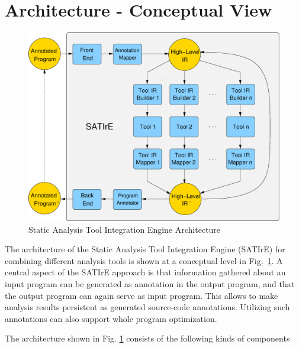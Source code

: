 \documentclass[a4paper,12pt]{report}
\newcommand{\satire}[0]{SATIrE}
\begin{document}
\section{Architecture - Conceptual View}
\label{sec:abstractarchitecture}

\begin{figure}
\includegraphics[scale=0.37]{abstractsatirearchitecture}
\caption{Static Analysis Tool Integration Engine Architecture}
\label{fig:abstractsatirearchitecture}
\end{figure}

The architecture of the Static Analysis Tool Integration Engine
(\satire) for combining different analysis tools is shown at a conceptual level in Fig.~\ref{fig:abstractsatirearchitecture}. A central
aspect of the SATIrE approach is that information gathered about an input program
can be generated as annotation in the output program, and that the
output program can again serve as input program. This allows to make
analysis results persistent as generated source-code
annotations. Utilizing such annotations can also support whole
program optimization.

The architecture shown in Fig. \ref{fig:abstractsatirearchitecture} consists of the following kinds of components
\end{document}
